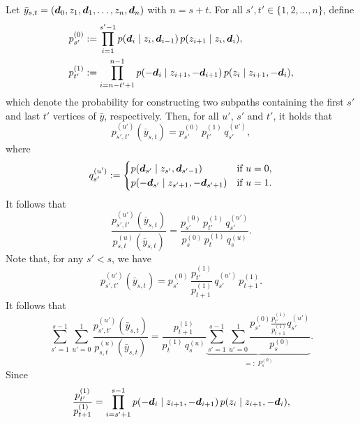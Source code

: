 Let $\bar{y}_{s,t} = (\bm{d}_0, z_1, \bm{d}_1, \ldots, z_n, \bm{d}_n)$ with $n = s + t$.
For all $s', t' \in \{ 1, 2, \ldots, n \}$, define
\begin{align}
p^{(0)}_{s'} &:= \prod_{i = 1}^{s' - 1} p( \bm{d}_i \;|\; z_i, \bm{d}_{i - 1} ) \, p( z_{i + 1} \;|\; z_i, \bm{d}_i ),\\
p^{(1)}_{t'} &:= \prod_{i = n - t' + 1}^{n - 1} p( -\bm{d}_i \;|\; z_{i + 1}, -\bm{d}_{i + 1} ) \, p( z_i \;|\; z_{i + 1}, -\bm{d}_i ),
\end{align}
which denote the probability for constructing two subpaths containing the first $s'$ and last $t'$ vertices of $\bar{y}$, respectively.
Then, for all $u'$, $s'$ and $t'$, it holds that
\begin{equation}
p^{(u')}_{s',t'}(\bar{y}_{s,t}) = p^{(0)}_{s'} \, p^{(1)}_{t'} \, q^{(u')}_{s'},
\end{equation}
where
\begin{equation}
q^{(u')}_{s'} := \begin{cases}
p( \bm{d}_{s'} \;|\; z_{s'}, \bm{d}_{s' - 1} ) & \text{if $u = 0$,}\\
p( -\bm{d}_{s'} \;|\; z_{s' + 1}, -\bm{d}_{s' + 1} ) & \text{if $u = 1$.}
\end{cases}
\end{equation}
It follows that
\begin{equation}
\label{eqn:bdpt_pdf_ratio_0}
\frac{p^{(u')}_{s', t'}(\bar{y}_{s,t})}{p^{(u)}_{s,t}(\bar{y}_{s,t})}
= \frac{p^{(0)}_{s'} \, p^{(1)}_{t'} \, q^{(u')}_{s'}}{p^{(0)}_s \, p^{(1)}_t \, q^{(u)}_s}.
\end{equation}
Note that, for any $s' < s$, we have
\begin{equation}
p^{(u')}_{s', t'}(\bar{y}_{s,t}) = p^{(0)}_{s'} \, \frac{p^{(1)}_{t'}}{p^{(1)}_{t + 1}} \, q^{(u')}_{s'} \,p^{(1)}_{t + 1}.
\end{equation}
It follows that
\begin{equation}
\label{eqn:bdpt_pdf_ratio_1}
\sum_{s' = 1}^{s - 1} \sum_{u' = 0}^1 \frac{p^{(u')}_{s', t'}(\bar{y}_{s,t})}{p^{(u)}_{s,t}(\bar{y}_{s,t})}
= \frac{p^{(1)}_{t + 1}}{p^{(1)}_t \, q^{(u)}_s}
\underbrace{\sum_{s' = 1}^{s - 1} \sum_{u' = 0}^1 \frac{p^{(0)}_{s'} \frac{p^{(1)}_{t'}}{p^{(1)}_{t + 1}} q^{(u')}_{s'}}{p^{(0)}_s}}_{=:\ P^{(0)}_s}.
\end{equation}
Since
\begin{equation}
\frac{p^{(1)}_{t'}}{p^{(1)}_{t + 1}}
= \prod_{i = s' + 1}^{s - 1} p( -\bm{d}_i \;|\; z_{i + 1}, -\bm{d}_{i + 1} ) \, p( z_i \;|\; z_{i + 1}, -\bm{d}_i ),
\end{equation}
